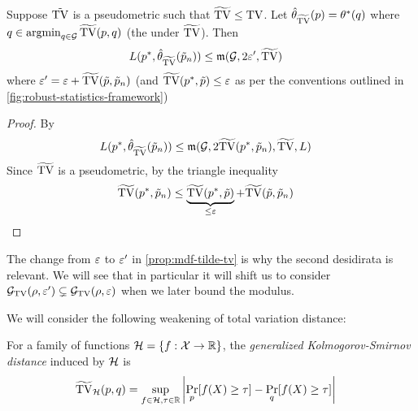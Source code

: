 \begin{proposition}\label{prop:mdf-tilde-tv}
    Suppose $\tilde{\operatorname{TV}}$ is a pseudometric such that
    $\widetilde{\operatorname{TV}} \leq \operatorname{TV}$. Let $\hat{\theta}_{\widetilde{\operatorname{TV}}}(p) = \theta^*(q)$ where
    $q \in \operatorname{argmin}_{q \in \mathcal{G}} \widetilde{\operatorname{TV}}(p, q)$ (the 
    under $\widetilde{\operatorname{TV}}$). Then
    \begin{align}
        L(p^*, \hat{\theta}_{\widetilde{\operatorname{TV}}}(\tilde{p}_n))
        &\leq \mathfrak{m}(\mathcal{G}, 2 \varepsilon', \widetilde{\operatorname{TV}})
    \end{align}
    where $\varepsilon' = \varepsilon + \widetilde{\operatorname{TV}}(\tilde{p}, \tilde{p}_n)$
    (and $\widetilde{\operatorname{TV}}(p^*, \tilde{p}) \leq \varepsilon$ as per the conventions
    outlined in \cref{fig:robust-statistics-framework})
\end{proposition}

\begin{proof}
    By 
    \begin{align}
        L(p^*, \hat{\theta}_{\widetilde{\operatorname{TV}}}(\tilde{p}_n))
        &\leq \mathfrak{m}(\mathcal{G}, 2 \widetilde{\operatorname{TV}}(p^*, \tilde{p}_n), \widetilde{\operatorname{TV}}, L)
    \end{align}
    Since $\widetilde{\operatorname{TV}}$ is a pseudometric, by the triangle
    inequality
    \begin{align}
        \widetilde{\operatorname{TV}}(p^*, \tilde{p}_n)
        &\leq \underbrace{\widetilde{\operatorname{TV}}(p^*, \tilde{p})}_{\leq \varepsilon} + \widetilde{\operatorname{TV}}(\tilde{p}, \tilde{p}_n)
    \end{align}
\end{proof}

\begin{remark}
    The change from $\varepsilon$ to $\varepsilon'$ in \cref{prop:mdf-tilde-tv} is why the
    second desidirata is relevant.  We will see that in particular it will shift us
    to consider $\mathcal{G}_{\operatorname{TV}}(\rho, \varepsilon') \subsetneq \mathcal{G}_{\operatorname{TV}}(\rho, \varepsilon)$ when we
    later bound the modulus.
\end{remark}

We will consider the following weakening of total variation distance:

\begin{definition}\label{def:tilde-tv}
    For a family of functions $\mathcal{H} = \{ f : \mathcal{X} \to \mathbb{R} \}$,
    the \emph{generalized Kolmogorov-Smirnov distance}
    induced by $\mathcal{H}$ is
    \begin{align}
        \widetilde{\operatorname{TV}}_{\mathcal{H}}(p, q) &= \sup_{f \in \mathcal{H}, \tau \in \mathbb{R}}
        \left\lvert \Pr_p[f(X) \geq \tau] - \Pr_q[f(X) \geq \tau] \right\rvert
    \end{align}
\end{definition}

